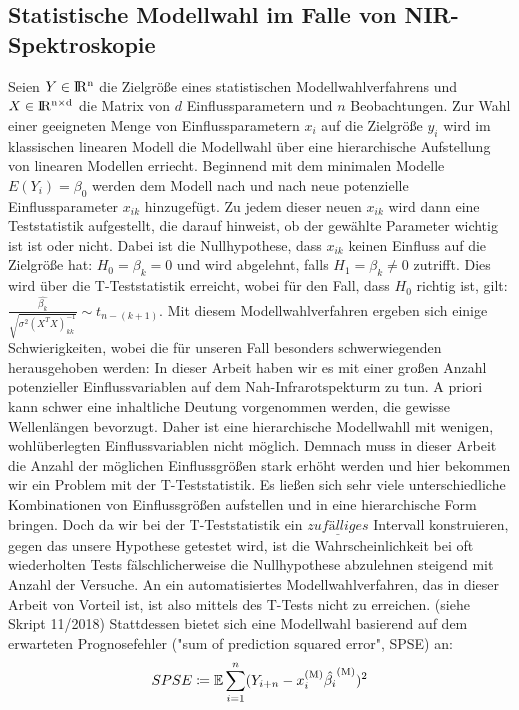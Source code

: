	\subsection{Statistische Modellwahl im Falle von NIR-Spektroskopie}
	\label{ssec:Statistische Modellwahl}
    	Seien $Y\in \rm I\!R^{n}$ die Zielgröße eines statistischen Modellwahlverfahrens und $X \in \rm I\!R^{n \times d}$ die Matrix von $d$ Einflussparametern und $n$ Beobachtungen.
    	Zur Wahl einer geeigneten Menge von Einflussparametern $x_i$ auf die Zielgröße $y_i$  wird im klassischen linearen Modell die Modellwahl über eine hierarchische Aufstellung von linearen Modellen erriecht.
    	Beginnend mit dem minimalen Modelle $E(Y_i) = \beta_0$ werden dem Modell nach und nach neue potenzielle Einflussparameter $x_{ik}$ hinzugefügt.
    	Zu jedem dieser neuen $x_{ik}$ wird dann eine Teststatistik aufgestellt, die darauf hinweist, ob der gewählte Parameter wichtig ist ist oder nicht.
    	Dabei ist die Nullhypothese, dass $x_{ik}$ keinen Einfluss auf die Zielgröße hat: $ H_0 = \beta_k = 0$ und wird abgelehnt, falls $H_1 = \beta_k \neq 0$ zutrifft.
    	Dies wird über die T-Teststatistik erreicht,  wobei für den Fall, dass $H_0$ richtig ist, gilt: $\frac{\hat{\beta_k}}{\sqrt{\sigma^2(X^TX)^{-1}_{kk}}} \sim t_{n-(k+1)}$.
    	Mit diesem Modellwahlverfahren ergeben sich einige Schwierigkeiten, wobei die für unseren Fall besonders schwerwiegenden herausgehoben werden: In dieser Arbeit haben wir es mit einer großen Anzahl potenzieller Einflussvariablen auf dem Nah-Infrarotspekturm zu tun.
    	A priori kann schwer eine inhaltliche Deutung vorgenommen werden, die gewisse Wellenlängen bevorzugt. Daher ist eine hierarchische Modellwahll mit wenigen, wohlüberlegten Einflussvariablen nicht möglich.
    	Demnach muss in dieser Arbeit die Anzahl der möglichen Einflussgrößen stark erhöht werden und hier bekommen wir ein Problem mit der T-Teststatistik.
    	Es ließen sich sehr viele unterschiedliche Kombinationen von Einflussgrößen aufstellen und in eine hierarchische Form bringen.
    	Doch da wir bei der T-Teststatistik ein $\underline{zufälliges}$ Intervall konstruieren, gegen das unsere Hypothese getestet wird, ist die Wahrscheinlichkeit bei oft wiederholten Tests fälschlicherweise die Nullhypothese abzulehnen steigend mit Anzahl der Versuche.
    	An ein automatisiertes Modellwahlverfahren, das in dieser Arbeit von Vorteil ist, ist also mittels des T-Tests nicht zu erreichen. (siehe Skript 11/2018)
    	Stattdessen bietet sich eine Modellwahl basierend auf dem erwarteten Prognosefehler ("sum of prediction squared error", SPSE) an:
    	\[
    		SPSE \coloneqq \operatorname{\mathbb{E}} \sum_{i=1}^{n} (Y_{i+n} - x_{i}^{\mathrm{(M)}}\hat{\beta_i}^{\mathrm{(M)}})^2
    	\]
    
